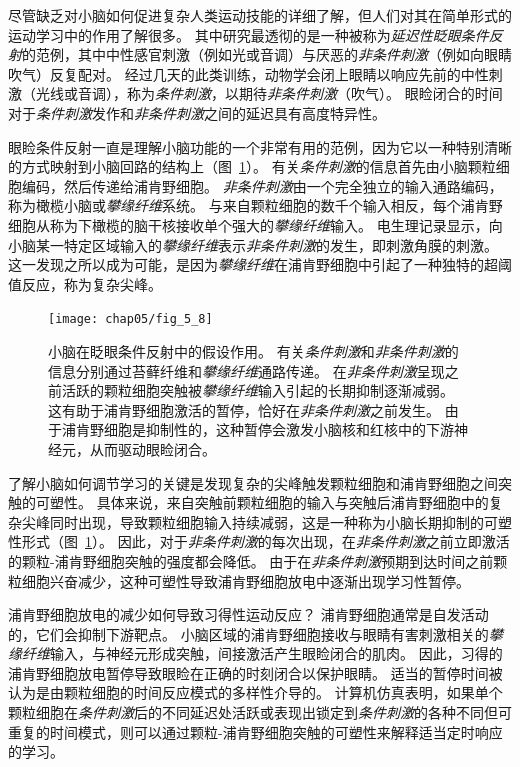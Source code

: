 尽管缺乏对小脑如何促进复杂人类运动技能的详细了解，但人们对其在简单形式的运动学习中的作用了解很多。
其中研究最透彻的是一种被称为\textit{延迟性眨眼条件反射}的范例，其中中性感官刺激（例如光或音调）与厌恶的\textit{非条件刺激}（例如向眼睛吹气）反复配对。
经过几天的此类训练，动物学会闭上眼睛以响应先前的中性刺激（光线或音调），称为\textit{条件刺激}，以期待\textit{非条件刺激}（吹气）。
眼睑闭合的时间对于\textit{条件刺激}发作和\textit{非条件刺激}之间的延迟具有高度特异性。


眼睑条件反射一直是理解小脑功能的一个非常有用的范例，因为它以一种特别清晰的方式映射到小脑回路的结构上（图~\ref{fig:5_8}）。
有关\textit{条件刺激}的信息首先由小脑颗粒细胞编码，然后传递给浦肯野细胞。
\textit{非条件刺激}由一个完全独立的输入通路编码，称为橄榄小脑或\textit{攀缘纤维}系统。
与来自颗粒细胞的数千个输入相反，每个浦肯野细胞从称为下橄榄的脑干核接收单个强大的\textit{攀缘纤维}输入。
电生理记录显示，向小脑某一特定区域输入的\textit{攀缘纤维}表示\textit{非条件刺激}的发生，即刺激角膜的刺激。
这一发现之所以成为可能，是因为\textit{攀缘纤维}在浦肯野细胞中引起了一种独特的超阈值反应，称为复杂尖峰。


\begin{figure}[htbp]
	\centering
	\texttt{[image: chap05/fig\_5\_8]}
	\caption{小脑在眨眼条件反射中的假设作用。
		有关\textit{条件刺激}和\textit{非条件刺激}的信息分别通过苔藓纤维和\textit{攀缘纤维}通路传递。
		在\textit{非条件刺激}呈现之前活跃的颗粒细胞突触被\textit{攀缘纤维}输入引起的长期抑制逐渐减弱。
		这有助于浦肯野细胞激活的暂停，恰好在\textit{非条件刺激}之前发生。
		由于浦肯野细胞是抑制性的，这种暂停会激发小脑核和红核中的下游神经元，从而驱动眼睑闭合。}
	\label{fig:5_8}
\end{figure}


了解小脑如何调节学习的关键是发现复杂的尖峰触发颗粒细胞和浦肯野细胞之间突触的可塑性。
具体来说，来自突触前颗粒细胞的输入与突触后浦肯野细胞中的复杂尖峰同时出现，导致颗粒细胞输入持续减弱，这是一种称为小脑长期抑制的可塑性形式（图~\ref{fig:5_8}）。
因此，对于\textit{非条件刺激}的每次出现，在\textit{非条件刺激}之前立即激活的颗粒-浦肯野细胞突触的强度都会降低。
由于在\textit{非条件刺激}预期到达时间之前颗粒细胞兴奋减少，这种可塑性导致浦肯野细胞放电中逐渐出现学习性暂停。


浦肯野细胞放电的减少如何导致习得性运动反应？
浦肯野细胞通常是自发活动的，它们会抑制下游靶点。 
小脑区域的浦肯野细胞接收与眼睛有害刺激相关的\textit{攀缘纤维}输入，与神经元形成突触，间接激活产生眼睑闭合的肌肉。
因此，习得的浦肯野细胞放电暂停导致眼睑在正确的时刻闭合以保护眼睛。
适当的暂停时间被认为是由颗粒细胞的时间反应模式的多样性介导的。
计算机仿真表明，如果单个颗粒细胞在\textit{条件刺激}后的不同延迟处活跃或表现出锁定到\textit{条件刺激}的各种不同但可重复的时间模式，则可以通过颗粒-浦肯野细胞突触的可塑性来解释适当定时响应的学习。


